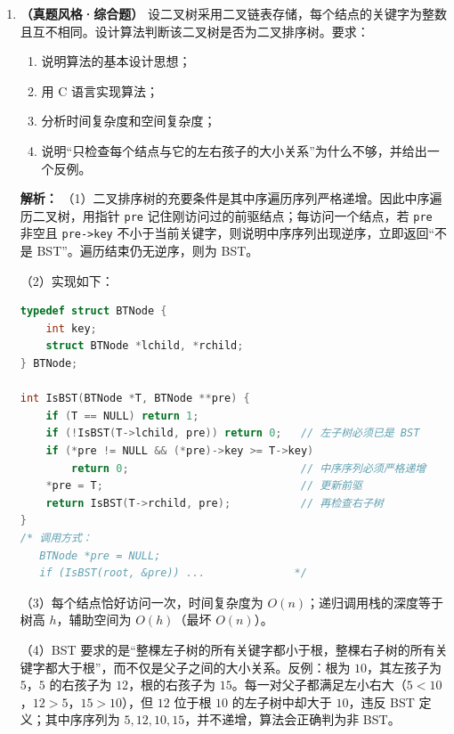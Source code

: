 \begin{enumerate}[resume]
\ifshowsolutions\newpage\fi
\item \textbf{（真题风格·综合题）} 设二叉树采用二叉链表存储，每个结点的关键字为整数且互不相同。设计算法判断该二叉树是否为二叉排序树。要求：
\begin{enumerate}
    \item[(1)] 说明算法的基本设计思想；
    \item[(2)] 用 C 语言实现算法；
    \item[(3)] 分析时间复杂度和空间复杂度；
    \item[(4)] 说明“只检查每个结点与它的左右孩子的大小关系”为什么不够，并给出一个反例。
\end{enumerate}

\ifshowsolutions\par\noindent\textbf{解析：} （1）二叉排序树的充要条件是其中序遍历序列严格递增。因此中序遍历二叉树，用指针 \texttt{pre} 记住刚访问过的前驱结点；每访问一个结点，若 \texttt{pre} 非空且 \texttt{pre->key} 不小于当前关键字，则说明中序序列出现逆序，立即返回“不是 BST”。遍历结束仍无逆序，则为 BST。

（2）实现如下：
\begin{lstlisting}[language=C]
typedef struct BTNode {
    int key;
    struct BTNode *lchild, *rchild;
} BTNode;

int IsBST(BTNode *T, BTNode **pre) {
    if (T == NULL) return 1;
    if (!IsBST(T->lchild, pre)) return 0;   // 左子树必须已是 BST
    if (*pre != NULL && (*pre)->key >= T->key)
        return 0;                           // 中序序列必须严格递增
    *pre = T;                               // 更新前驱
    return IsBST(T->rchild, pre);           // 再检查右子树
}
/* 调用方式：
   BTNode *pre = NULL;
   if (IsBST(root, &pre)) ...              */
\end{lstlisting}

（3）每个结点恰好访问一次，时间复杂度为 $O(n)$；递归调用栈的深度等于树高 $h$，辅助空间为 $O(h)$（最坏 $O(n)$）。

（4）BST 要求的是“整棵左子树的所有关键字都小于根，整棵右子树的所有关键字都大于根”，而不仅是父子之间的大小关系。反例：根为 $10$，其左孩子为 $5$，$5$ 的右孩子为 $12$，根的右孩子为 $15$。每一对父子都满足左小右大（$5<10$，$12>5$，$15>10$），但 $12$ 位于根 $10$ 的左子树中却大于 $10$，违反 BST 定义；其中序序列为 $5,12,10,15$，并不递增，算法会正确判为非 BST。
\par\noindent{}\else \answerarea[10] \fi

\end{enumerate}
